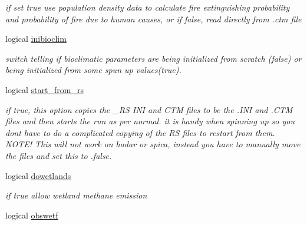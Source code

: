 \begin{DoxyCompactItemize}
\begin{DoxyCompactList}\small\item\em if set true use population density data to calculate fire extinguishing probability and probability of fire due to human causes, or if false, read directly from .ctm file \end{DoxyCompactList}\item 
\hypertarget{structctem__statevars_1_1ctem__switches_a363efc622307abfadb56494f98bf4b35}{}logical \hyperlink{structctem__statevars_1_1ctem__switches_a363efc622307abfadb56494f98bf4b35}{inibioclim}\label{structctem__statevars_1_1ctem__switches_a363efc622307abfadb56494f98bf4b35}

\begin{DoxyCompactList}\small\item\em switch telling if bioclimatic parameters are being initialized from scratch (false) or being initialized from some spun up values(true). \end{DoxyCompactList}\item 
\hypertarget{structctem__statevars_1_1ctem__switches_aacd9aa69804fc52f340ea0652d410f9d}{}logical \hyperlink{structctem__statevars_1_1ctem__switches_aacd9aa69804fc52f340ea0652d410f9d}{start\+\_\+from\+\_\+rs}\label{structctem__statevars_1_1ctem__switches_aacd9aa69804fc52f340ea0652d410f9d}

\begin{DoxyCompactList}\small\item\em if true, this option copies the \+\_\+\+R\+S I\+N\+I and C\+T\+M files to be the .I\+N\+I and .C\+T\+M files and then starts the run as per normal. it is handy when spinning up so you don\textquotesingle{}t have to do a complicated copying of the R\+S files to restart from them. N\+O\+T\+E! This will not work on hadar or spica, instead you have to manually move the files and set this to .false. \end{DoxyCompactList}\item 
\hypertarget{structctem__statevars_1_1ctem__switches_a8784d0eb86363cf7060f8f0e5a882558}{}logical \hyperlink{structctem__statevars_1_1ctem__switches_a8784d0eb86363cf7060f8f0e5a882558}{dowetlands}\label{structctem__statevars_1_1ctem__switches_a8784d0eb86363cf7060f8f0e5a882558}

\begin{DoxyCompactList}\small\item\em if true allow wetland methane emission \end{DoxyCompactList}\item 
\hypertarget{structctem__statevars_1_1ctem__switches_a009ff20d4bbfe0d7435397cf39fda85a}{}logical \hyperlink{structctem__statevars_1_1ctem__switches_a009ff20d4bbfe0d7435397cf39fda85a}{obswetf}\label{structctem__statevars_1_1ctem__switches_a009ff20d4bbfe0d7435397cf39fda85a}


\end{DoxyCompactItemize}
